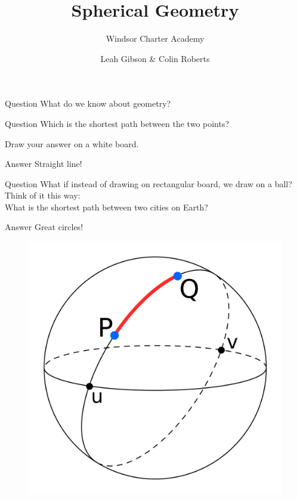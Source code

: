 \documentclass[UKenglish]{beamer}
\author{Leah Gibson \& Colin Roberts}
\title{Spherical Geometry}
\subtitle{Windsor Charter Academy}
\begin{document}
\begin{frame}{Question}
    What do we know about geometry?
\end{frame}


\begin{frame}{Question}
    Which is the shortest path between the two points?
    \pause
    \begin{figure}[H]
  \centering
  
    \end{figure}
    Draw your answer on a white board.
\end{frame}

\begin{frame}{Answer}
    Straight line!
    \vspace*{2.5cm}
        \begin{figure}[H]
  \centering
  
    \end{figure}
\end{frame}

\begin{frame}{Question}
    What if instead of drawing on rectangular board, we draw on a ball?
    \vfill
    \pause
    Think of it this way:\\
    
    \pause
    What is the shortest path between two cities on Earth? 
\end{frame} 

\begin{frame}{Answer}
    Great circles!
    \vfill
    \begin{figure}[H]
        \centering
        \includegraphics[width=.6\textwidth]{Figures/great_circle.png}
    \end{figure}
\end{frame}
\end{document}
